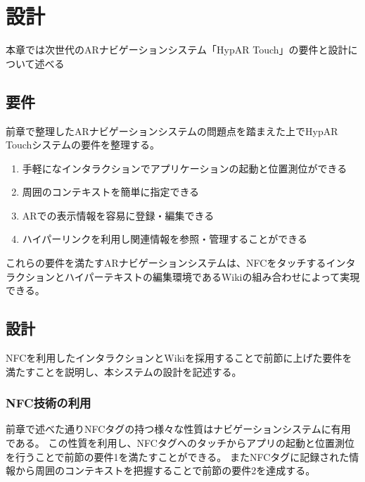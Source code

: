 \chapter{設計}
\label{chap:design}

本章では次世代のARナビゲーションシステム「HypAR Touch」の要件と設計について述べる

\newpage

\section{要件}
前章で整理したARナビゲーションシステムの問題点を踏まえた上でHypAR Touchシステムの要件を整理する。
\begin{enumerate}
  \item 手軽になインタラクションでアプリケーションの起動と位置測位ができる
  \item 周囲のコンテキストを簡単に指定できる
  \item ARでの表示情報を容易に登録・編集できる
  \item ハイパーリンクを利用し関連情報を参照・管理することができる
\end{enumerate}
これらの要件を満たすARナビゲーションシステムは、NFCをタッチするインタラクションとハイパーテキストの編集環境であるWikiの組み合わせによって実現できる。

\section{設計}
NFCを利用したインタラクションとWikiを採用することで前節に上げた要件を満たすことを説明し、本システムの設計を記述する。

\subsection{NFC技術の利用}
前章で述べた通りNFCタグの持つ様々な性質はナビゲーションシステムに有用である。
この性質を利用し、NFCタグへのタッチからアプリの起動と位置測位を行うことで前節の要件1を満たすことができる。
またNFCタグに記録された情報から周囲のコンテキストを把握することで前節の要件2を達成する。

